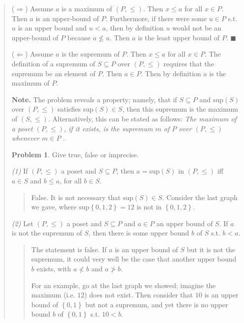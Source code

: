 \documentclass[a4paper, 12pt]{article}
\theoremstyle{definition}
\newtheorem{problem}{Problem}
\theoremstyle{definition}
\theoremstyle{definition}
\begin{document}
\begin{quote}
($\Rightarrow$) Assume $a$ is a maximum of $(P, \leq) $. Then $x \leq a$ for all
$x \in P$. Then $a$ is an upper-bound of $P$. Furthermore, if there were some $u
\in P$ s.t. $u$ is an upper bound and $u < a$, then by definition $u$ would not
be an upper-bound of $P$ because $a \not\leq u$. Then $a$ is the least upper
bound of $P$. $\blacksquare$

($\Leftarrow$) Assume $a$ is the supremum of $P$. Then $x \leq a$ for all $x \in
P$. The definition of a supremum of $S \subseteq P$ over $(P, \leq) $ requires
that the supremum be an element of $P$. Then $a \in P$. Then by definition $a$
is the maximum of $P$.

\textbf{Note.} The problem reveals a property; namely, that if $S \subseteq P$
and $\text{sup}(S)$ over $(P, \leq) $ satisfies $\text{sup}(S) \in S$, then this
supremum is the maximum of $(S, \leq)$. Alternatively, this can be stated as
follows: \textit{The maximum of a poset $(P, \leq) $, if it exists, is the
supremum $m$ of $P$ over $(P, \leq) $ whenever $m \in P$ }.

\begin{problem}
    Give true, false or imprecise.
\end{problem}

\textit{(1)} If $(P, \leq) $ a poset and $S \subseteq P$, then $a =
\text{sup}(S)$ in $(P, \leq) $ iff $a \in S$ and $b \leq a$, for all $b \in  S$.

\begin{quote}
    False. It is not necessary that $\text{sup}(S) \in S$. Consider the last
    graph we gave, where $\text{sup}\left\{ 0, 1, 2 \right\} = 12 $ is not in $\left\{
    0, 1, 2 \right\} $.
\end{quote}

\textit{(2)} Let $(P, \leq) $ a poset and $S \subseteq P$ and $a \in P$ an upper
bound of $S$. If $a$ is not the supremum of $S$, then there is some upper bound
$b$ of $S$ s.t. $b < a$.

\begin{quote}
    The statement is false. If $a$ is an upper bound of $S$ but it is not the supremum,
    it could very well be the case that another upper bound $b$ exists, with $a
    \not < b$ and $a \not > b$. 

    For an example, go at the last graph we showed;
    imagine the maximum (i.e. $12$) does not exist. Then consider that $10$ is
    an upper bound of $\left\{ 0, 1 \right\} $ but not a supremum, and yet there
    is no upper bound $b$ of $\left\{ 0, 1 \right\} $ s.t. $10 < b$.
\end{quote}


\end{quote}
\end{document}
